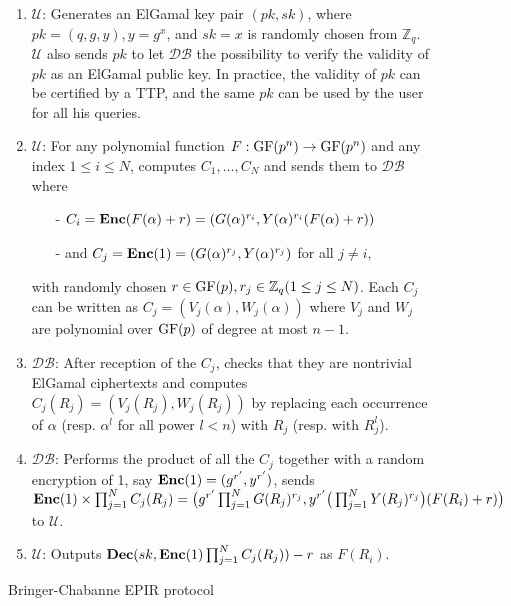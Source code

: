 \documentclass[JMC]{degruyter-journal}
\begin{document}
\begin{figure}[t]
\begin{center}
\begin{boxedminipage}{12cm}
\begin{enumerate}
\itemsep=-0.1cm
\item $\mathcal{U}$:
Generates an ElGamal key pair $(pk, sk)$, where $pk = (q, g, y), y =
g^x$, and $sk = x$ is randomly chosen from $\mathbb{Z}_q$.
$\mathcal{U}$ also sends $pk$ to let $\mathcal{DB}$ the possibility
to verify the validity of $pk$ as an ElGamal public key. In
practice, the validity of $pk$ can be certified by a TTP, and the
same $pk$ can be used by the user for all his queries.



\item $\mathcal{U}$: For any polynomial function $F: {\rm GF}(p^n) \rightarrow {\rm GF}(p^n)$
and any index $1 \leq i \leq N$, computes $C_1,\ldots , C_N$ and
sends them to $\mathcal{DB}$ where
\begin{enumerate}
\item[-] $C_i = {\bf Enc} (F (\alpha) + r) = (G(\alpha)^{r_i} , Y (\alpha)^{r_i} (F (\alpha) + r))$
\item[-] and $C_j = {\bf Enc} (1) = (G(\alpha)^{r_j} , Y (\alpha)^{r_j} )$ for all  $j\neq i$,
\end{enumerate}
with randomly chosen $r\in {\rm GF}(p), r_j \in \mathbb{Z}_q (1\leq
j \leq N)$. Each $C_j$ can be written as $C_j = (V_j (\alpha),W_j
(\alpha))$ where $V_j$ and $W_j$ are polynomial over ${\rm GF}(p)$
of degree at most $n-1$.
\item $\mathcal{DB}$: After reception of the $C_j$, checks that they are nontrivial
ElGamal ciphertexts and computes $C_j (R_j) = (V_j (R_j),W_j (R_j))$
by replacing each occurrence of $\alpha$ (resp. $\alpha^{l}$ for
all power $l< n$) with $R_j$ (resp. with $R^{l}_j$).
\item  $\mathcal{DB}$: {Performs the product of all the $C_j$ together with a random encryption
of 1, say ${\bf Enc}(1) = (g^{r^{\prime}}, y^{r^{\prime}})$, sends
${\bf Enc}(1)\times \prod_{j=1}^{N}C_{j}(R_j)=\big( g^{r^{\prime}}\prod_{j=1}^{N}G(R_j)^{r_j},
y^{r^{\prime}}\big(\prod_{j=1}^{N}Y(R_j)^{r_j}\big)(F(R_i)+r)\big)$ to $\mathcal{U}$.}
\item $\mathcal{U}$:  Outputs ${\bf Dec}(sk, {\bf Enc}(1) \prod_{j=1}^{N}C_{j}(R_j))-r$ as $F(R_i)$.
\end{enumerate}
\end{boxedminipage}
\end{center}
\caption{Bringer-Chabanne EPIR protocol}
\label{fig:EPIR}
\end{figure}
\end{document}
